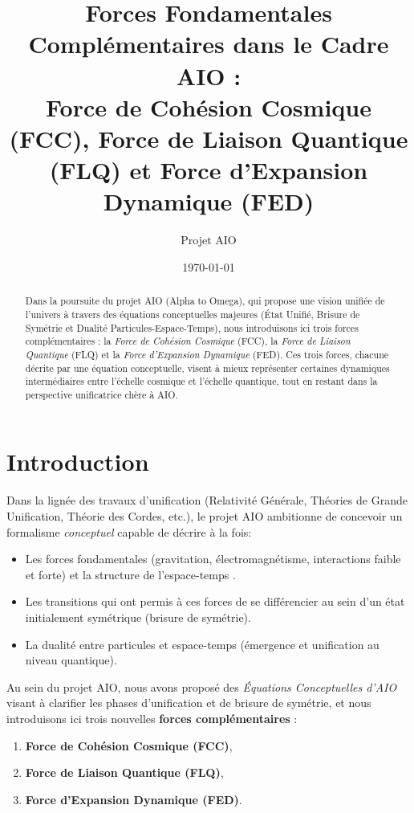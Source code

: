 \documentclass[12pt]{article}
\begin{document}
\title{\textbf{Forces Fondamentales Complémentaires dans le Cadre AIO :}\\
Force de Cohésion Cosmique (FCC), Force de Liaison Quantique (FLQ) et Force d'Expansion Dynamique (FED)}
\author{Projet AIO}
\date{\today}
\maketitle

\begin{abstract}
Dans la poursuite du projet AIO (Alpha to Omega), qui propose une vision unifiée de l'univers 
à travers des équations conceptuelles majeures (État Unifié, Brisure de Symétrie et Dualité 
Particules-Espace-Temps), nous introduisons ici trois forces complémentaires : 
la \emph{Force de Cohésion Cosmique} (FCC), la \emph{Force de Liaison Quantique} (FLQ) 
et la \emph{Force d'Expansion Dynamique} (FED). Ces trois forces, chacune décrite par 
une équation conceptuelle, visent à mieux représenter certaines dynamiques intermédiaires 
entre l'échelle cosmique et l'échelle quantique, tout en restant dans la perspective 
unificatrice chère à AIO.
\end{abstract}

\tableofcontents

\section{Introduction}

Dans la lignée des travaux d'unification (Relativité Générale, Théories de Grande Unification, 
Théorie des Cordes, etc.), le projet AIO ambitionne de concevoir un formalisme \emph{conceptuel} 
capable de décrire à la fois:
\begin{itemize}
    \item Les forces fondamentales (gravitation, électromagnétisme, interactions faible et forte) 
          et la structure de l'espace-temps \cite{weinberg1995quantum, zee2010quantum}.
    \item Les transitions qui ont permis à ces forces de se différencier au sein 
          d'un état initialement symétrique (brisure de symétrie).
    \item La dualité entre particules et espace-temps (émergence et unification au niveau quantique).
\end{itemize}

Au sein du projet AIO, nous avons proposé des \emph{Équations Conceptuelles d'AIO} visant 
à clarifier les phases d'unification et de brisure de symétrie, 
et nous introduisons ici trois nouvelles \textbf{forces complémentaires} :
\begin{enumerate}
    \item \textbf{Force de Cohésion Cosmique (FCC)}, 
    \item \textbf{Force de Liaison Quantique (FLQ)}, 
    \item \textbf{Force d'Expansion Dynamique (FED)}.
\end{enumerate}
\end{document}
